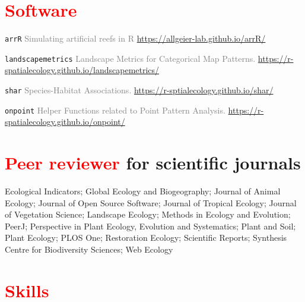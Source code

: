 \documentclass[hidelinks]{report}
\begin{document}

\section*{\textcolor{red}{Software} \sout{\hfill}}

\texttt{arrR} \textcolor{grey}{Simulating artificial reefs in R}
\hfill
\footnotesize{\textcolor{green}{\href{https://allgeier-lab.github.io/arrR/}{https://allgeier-lab.github.io/arrR/}}}

\texttt{landscapemetrics} \textcolor{grey}{Landscape Metrics for Categorical Map Patterns.}
\hfill
\footnotesize{\textcolor{green}{\href{https://r-spatialecology.github.io/landscapemetrics/}{https://r-spatialecology.github.io/landscapemetrics/}}}

\texttt{shar} \textcolor{grey}{Species-Habitat Associations.}
\hfill
\footnotesize{\textcolor{green}{\href{https://r-sptialecology.github.io/shar/}{https://r-sptialecology.github.io/shar/}}}

\texttt{onpoint} \textcolor{grey}{Helper Functions related to Point Pattern Analysis.}
\hfill
\footnotesize{\textcolor{green}{\href{https://r-spatialecology.github.io/onpoint/}{https://r-spatialecology.github.io/onpoint/}}}



\section*{\textcolor{red}{Peer reviewer} for scientific journals \sout{\hfill}}

Ecological Indicators;
Global Ecology and Biogeography;
Journal of Animal Ecology;
Journal of Open Source Software;
Journal of Tropical Ecology;
Journal of Vegetation Science;
Landscape Ecology;
Methods in Ecology and Evolution;
PeerJ;
Perspective in Plant Ecology, Evolution and Systematics;
Plant and Soil;
Plant Ecology;
PLOS One;
Restoration Ecology;
Scientific Reports;
Synthesis Centre for Biodiversity Sciences;
Web Ecology



\section*{\textcolor{red}{Skills} \sout{\hfill}}
\end{document}
